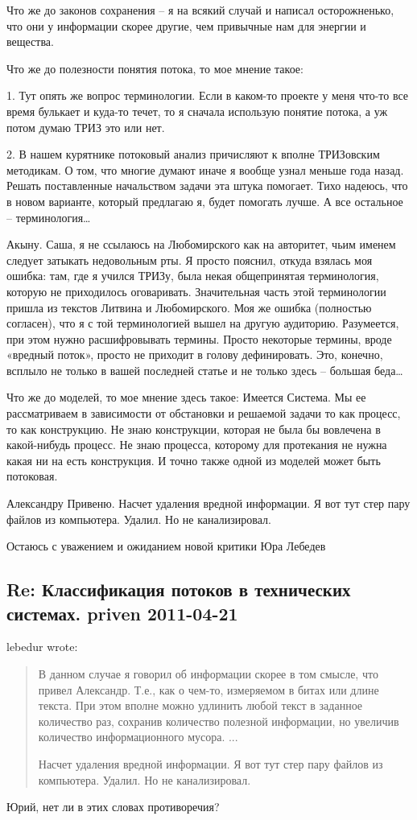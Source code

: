 \documentclass[a4paper,11pt]{article}
\begin{document}
Что же до законов сохранения – я на всякий случай и написал осторожненько, что
они у информации скорее другие, чем привычные нам для энергии и вещества.

Что же до полезности понятия потока, то мое мнение такое:

1. Тут опять же вопрос терминологии. Если в каком-то проекте у меня что-то все
время булькает и куда-то течет, то я сначала использую понятие потока, а уж
потом думаю ТРИЗ это или нет.

2. В нашем курятнике потоковый анализ причисляют к вполне ТРИЗовским
методикам. О том, что многие думают иначе я вообще узнал меньше года назад.
Решать поставленные начальством задачи эта штука помогает. Тихо надеюсь, что в
новом варианте, который предлагаю я, будет помогать лучше. А все остальное –
терминология…

Акыну. Саша, я не ссылаюсь на Любомирского как на авторитет, чьим именем
следует затыкать недовольным рты. Я просто пояснил, откуда взялась моя ошибка:
там, где я учился ТРИЗу, была некая общепринятая терминология, которую не
приходилось оговаривать. Значительная часть этой терминологии пришла из
текстов Литвина и Любомирского. Моя же ошибка (полностью согласен), что я с
той терминологией вышел на другую аудиторию. Разумеется, при этом нужно
расшифровывать термины. Просто некоторые термины, вроде «вредный поток»,
просто не приходит в голову дефинировать. Это, конечно, всплыло не только в
вашей последней статье и не только здесь – большая беда…

Что же до моделей, то мое мнение здесь такое: Имеется Система. Мы ее
рассматриваем в зависимости от обстановки и решаемой задачи то как процесс, то
как конструкцию. Не знаю конструкции, которая не была бы вовлечена в
какой-нибудь процесс. Не знаю процесса, которому для протекания не нужна какая
ни на есть конструкция. И точно также одной из моделей может быть потоковая.

Александру Привеню. Насчет удаления вредной информации. Я вот тут стер пару
файлов из компьютера. Удалил. Но не канализировал.

Остаюсь с уважением и ожиданием новой критики
Юра Лебедев

\subsection*{Re: Классификация потоков в технических системах.  priven
  2011-04-21}

lebedur wrote:
\begin{quote}  
  В данном случае я говорил об информации скорее в том смысле, что привел
  Александр. Т.е., как о чем-то, измеряемом в битах или длине текста. При этом
  вполне можно удлинить любой текст в заданное количество раз, сохранив
  количество полезной информации, но увеличив количество информационного
  мусора.  ...
  
  Насчет удаления вредной информации. Я вот тут стер пару файлов из
  компьютера.  Удалил. Но не канализировал.
\end{quote}
Юрий, нет ли в этих словах противоречия?
\end{document}
